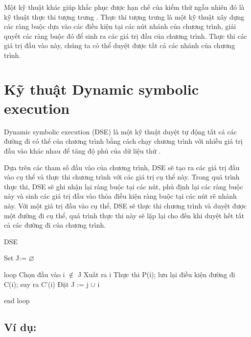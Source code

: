 Một kỹ thuật khác giúp khắc phục được hạn chế của kiểm thử ngẫu nhiên đó là kỹ thuật thực thi tượng trưng \cite{king1976symbolic}. Thực thi tượng trưng là một kỹ thuật xây dựng các ràng buộc dựa vào các điều kiện tại các nút nhánh của chương trình, giải quyết các ràng buộc đó để sinh ra các giá trị  đầu của chương trình. Thực thi các giá trị đầu vào này, chúng ta có thể duyệt được tất cả các nhánh của chương trình. 


\section{Kỹ thuật Dynamic symbolic execution}

Dynamic symbolic execution (DSE) là một kỹ thuật duyệt tự động tất cả các đường đi có thể của chương trình bằng cách chạy chương trình với nhiều giá trị đầu vào khác nhau để tăng độ phủ của dữ liệu thử \cite{xie2009fitness}.

Dựa trên các tham số đầu vào của chương trình, DSE sẽ tạo ra các giá trị đầu vào cụ thể và thực thi chương trình với các giá trị cụ thể này. Trong quá trình thực thi, DSE sẽ ghi nhận lại ràng buộc tại các nút, phủ định lại các ràng buộc này và sinh các giá trị đầu vào thỏa điều kiện ràng buộc tại các nút rẽ nhánh này. Với một giá trị đầu vào cụ thể, DSE sẽ thực thi chương trình và duyệt được một đường đi cụ thể, quá trình thực thi này sẽ lặp lại cho đến khi duyệt hết tất cả các đường đi của chương trình.

\begin{algorithm}
	\caption{DSE}
	\begin{algorithmic}	
		\item Set J:= $\varnothing $ 
		\item loop
			\subitem Chọn đầu vào i $\notin $ J 
			\subitem Xuất ra i
			\subitem Thực thi P(i); lưu lại điều kiện đường đi C(i); suy ra C'(i)
			\subitem Đặt J := j $\cup $ i			
		\item end loop
	\end{algorithmic}
\end{algorithm}

\subsection*{Ví dụ:}


	
